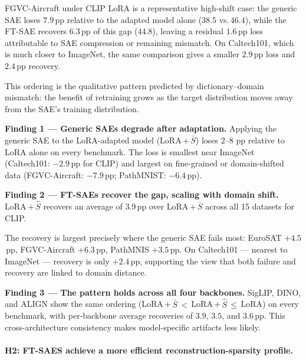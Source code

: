 %


FGVC-Aircraft under CLIP LoRA is a representative high-shift case: the generic SAE loses
$7.9$\,pp relative to the adapted model alone ($38.5$ vs.\,$46.4$), while the FT-SAE
recovers $6.3$\,pp of this gap ($44.8$), leaving a residual $1.6$\,pp loss attributable to
SAE compression or remaining mismatch.
On Caltech101, which is much closer to ImageNet, the same comparison gives a smaller
$2.9$\,pp loss and $2.4$\,pp recovery.

This ordering is the qualitative pattern predicted by dictionary--domain mismatch: the
benefit of retraining grows as the target distribution moves away from the SAE's training
distribution.




\textbf{Finding 1 — Generic SAEs degrade after adaptation.}
Applying the generic SAE to the LoRA-adapted model
(LoRA\,+\,$\bar{S}$) loses $2$--$8$ pp relative to LoRA alone on every benchmark.
The loss is smallest near ImageNet (Caltech101: $-2.9$\,pp for CLIP)
and largest on fine-grained or domain-shifted data
(FGVC-Aircraft: $-7.9$\,pp; PathMNIST: $-6.4$\,pp).


 
\textbf{Finding 2 — FT-SAEs recover the gap, scaling with domain shift.}
LoRA\,+\,$\hat{S}$ recovers an average of $\mathbf{3.9}$\,pp over LoRA\,+\,$\bar{S}$
across all 15 datasets for CLIP.



The recovery is largest precisely where the generic SAE fails most:
EuroSAT $+4.5$\,pp, FGVC-Aircraft $+6.3$\,pp, PathMNIS $+3.5$\,pp.
On Caltech101 --- nearest to ImageNet --- recovery is only $+2.4$\,pp,
supporting the view that both failure and recovery are linked to domain distance.

\textbf{Finding 3 — The pattern holds across all four backbones.}
SigLIP, DINO, and ALIGN show the same ordering
(LoRA\,+\,$\bar{S}$\,$<$\,LoRA\,+\,$\hat{S}$\,$\leq$\,LoRA) on every benchmark,
with per-backbone average recoveries of $3.9$, $3.5$, and $3.6$\,pp.
This cross-architecture consistency makes model-specific artifacts less likely.

%
\vspace{-5pt}
\paragraph{H2: FT-SAES achieve a more efficient reconstruction-sparsity profile.}
\label{sec:exp:h2}

